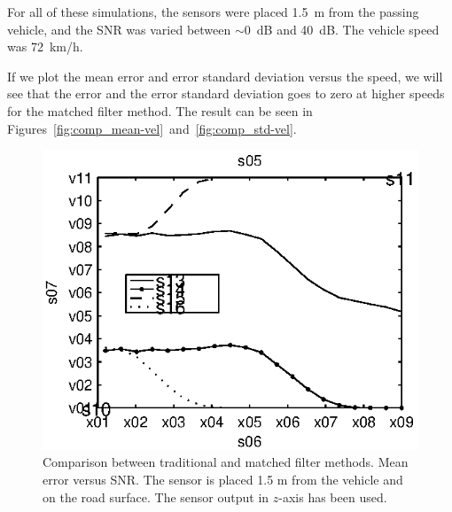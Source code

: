 For all of these simulations, the sensors were placed 1.5~m from the passing vehicle, and the SNR was varied between $\sim0{}$~dB and 40~dB. The vehicle speed was 72~km/h.

If we plot the mean error and error standard deviation versus the speed, we will see that the error and the error standard deviation goes to zero at higher speeds for the matched filter method. The result can be seen in \mbox{Figures \ref{fig:comp_mean-vel} and \ref{fig:comp_std-vel}.}

\begin{subfigures}
\begin{figure}[!tbhf]
  \centering
  \begin{minipage}{0.45\linewidth}
  \centering
  
   \includegraphics[width=\linewidth]{images/mean_error_z}
  \caption[Time difference, method comparison. Mean error.  $\hat{z}$-axis.]{Comparison between traditional and matched filter methods. Mean error versus SNR. The sensor is placed 1.5 m from the vehicle and on the road surface. The sensor output in $\hat{z}$-axis has been used.}
  \label{fig:comp_mean_z}
  \end{minipage}\hfill
  \begin{minipage}{0.45\linewidth}
   \centering
   

\end{minipage}
\end{figure}
\end{subfigures}
